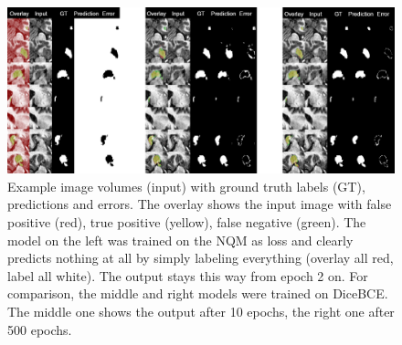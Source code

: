 \begin{figure}[h!]
    \centering
    \includegraphics[width=\linewidth]{Graphics/Experiments/4.1.1_DiceBce_GT_vs._NQM_only_v2.png}
    \caption{Example image volumes (input) with ground truth labels (GT), predictions and errors. The overlay shows the input image with false positive (red), true positive (yellow), false negative (green). The model on the left was trained on the NQM as loss and clearly predicts nothing at all by simply labeling everything (overlay all red, label all white). The output stays this way from epoch 2 on. For comparison, the middle and right models were trained on DiceBCE. The middle one shows the output after 10 epochs, the right one after 500 epochs.}
    \label{fig:exp.01.1:DiceBce_vs_NQM_only}
\end{figure}